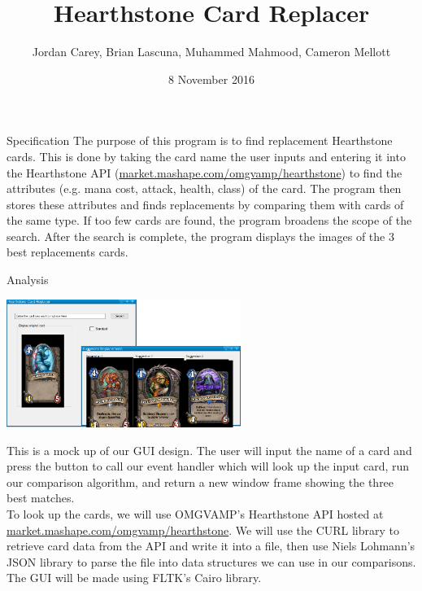\documentclass[aspectratio=169]{beamer}
\title{Hearthstone Card Replacer}
\author{Jordan Carey, Brian Lascuna, Muhammed Mahmood, Cameron Mellott}
\institute{Ohlone College CS102}
\date{8 November 2016}
\begin{document}
\beamertemplatenavigationsymbolsempty

\begin{frame}{Specification}
The purpose of this program is to find replacement Hearthstone cards. 
This is done by taking the card name the user inputs and entering it into
the Hearthstone API (\url{market.mashape.com/omgvamp/hearthstone}) to find the 
attributes (e.g. mana cost, attack, health, 
class) of the card. The program then stores these attributes and finds 
replacements by comparing them with cards of the same 
type. If too few cards are found, the program broadens the scope of the search.
After the search is complete, the program displays the images of the 3 best 
replacements cards.
\end{frame}

\begin{frame}[allowframebreaks]{Analysis}
\begin{center}
\includegraphics[width=3in]{Analysis.eps}
\end{center}
This is a mock up of our GUI design. The user will input the name of a card and
press the button to call our event handler which will look up the input card,
run our comparison algorithm, and return a new window frame showing the three
best matches.\\
\pagebreak
To look up the cards, we will use OMGVAMP's Hearthstone API hosted at
\url{market.mashape.com/omgvamp/hearthstone}. We will use the CURL library to 
retrieve card data from the API and write it into a file, then use
Niels Lohmann's JSON library to parse the file
into data structures we can use in our comparisons. The GUI will be made using
FLTK's Cairo library.
\\

\end{frame}
\end{document}
